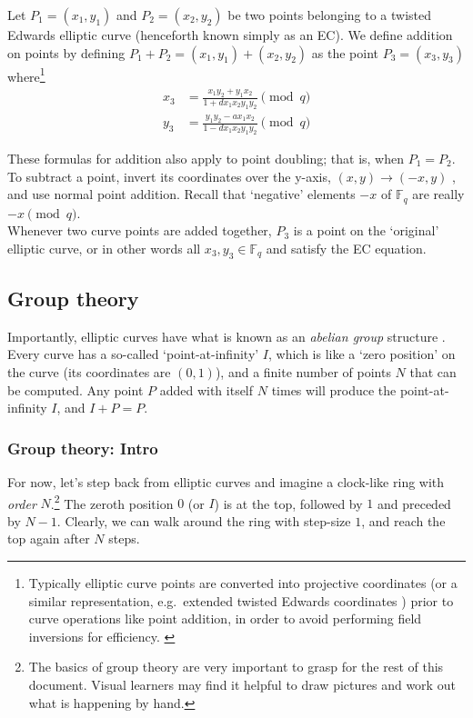 Let \(P_1 = (x_1, y_1)\) and \(P_2 = (x_2, y_2)\) be two points belonging to a twisted Edwards elliptic curve (henceforth known simply as an EC). We define addition on points by defining $P_1 + P_2 = (x_1, y_1) + (x_2, y_2)$ as the point $P_3 = (x_3, y_3)$ where\footnote{Typically elliptic curve points are converted into projective coordinates (or a similar representation, e.g.\ extended twisted Edwards coordinates \cite{twisted-edwards-revisited}) prior to curve operations like point addition, in order to avoid performing field inversions for efficiency. \cite{ecc-projective}}\vspace{.175cm}
\begin{align*}
x_3 & =  \frac{x_1 y_2 + y_1 x_ 2}{1 + d x_1 x_2 y_1 y_2}  \pmod{q} \\
y_3 & =  \frac{y_1 y_2 - a x_1 x_2}{1 - d x_1 x_2 y_1 y_2} \pmod{q} 
\end{align*}

These formulas for addition also apply to point doubling; that is, when  \(P_1 = P_2\). To subtract a point, invert its coordinates over the y-axis, $(x,y) \rightarrow (-x,y)$ \cite{Bernstein2008-twisted-edwards}, and use normal point addition. Recall that `negative' elements $-x$ of $\mathbb{F}_q$ are really $-x \pmod{q}$.
\\

Whenever two curve points are added together, $P_3$ is a point on the `original' elliptic curve, or in other words all $x_3,y_3 \in \mathbb{F}_q$ and satisfy the EC equation.


\subsection{Group theory}
\label{subsec:group-theory}

Importantly, elliptic curves have what is known as an {\em abelian group} structure \cite{abelian-group}. Every curve has a so-called `point-at-infinity' $I$, which is like a `zero position' on the curve (its coordinates are $(0, 1)$), and a finite number of points $N$ that can be computed. Any point $P$ added with itself $N$ times will produce the point-at-infinity $I$, and $I + P = P$.

\subsubsection{Group theory: Intro}

For now, let's step back from elliptic curves and imagine a clock-like ring with {\em order} $N$.\footnote{The basics of group theory are very important to grasp for the rest of this document. Visual learners may find it helpful to draw pictures and work out what is happening by hand.} The zeroth position $0$ (or $I$) is at the top, followed by $1$ and preceded by $N-1$. Clearly, we can walk around the ring with step-size $1$, and reach the top again after $N$ steps.


